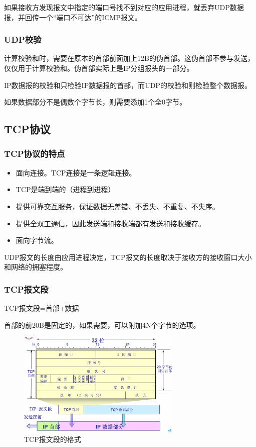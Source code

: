 \documentclass[12pt, a4paper, oneside]{ctexart}
\begin{document}
如果接收方发现报文中指定的端口号找不到对应的应用进程，就丢弃UDP数据报，并回传一个“端口不可达”的ICMP报文。

\subsubsection{UDP校验}

计算校验和时，需要在原本的首部前面加上12B的伪首部。这伪首部不参与发送，仅仅用于计算校验和。伪首部实际上是IP分组报头的一部分。

IP数据报的校验和只检验IP数据报的首部，而UDP的校验和则检验整个数据报。

如果数据部分不是偶数个字节长，则需要添加1个全0字节。

\subsection{TCP协议}

\subsubsection{TCP协议的特点}

\begin{itemize}
    \item 面向连接。TCP连接是一条逻辑连接。
    \item TCP是端到端的（进程到进程）
    \item 提供可靠交互服务，保证数据无差错、不丢失、不重复、不失序。
    \item 提供全双工通信，因此发送端和接收端都有发送和接收缓存。
    \item 面向字节流。
\end{itemize}

UDP报文的长度由应用进程决定，TCP报文的长度取决于接收方的接收窗口大小和网络的拥塞程度。

\subsubsection{TCP报文段}

TCP报文段=首部+数据

首部的前20B是固定的，如果需要，可以附加4N个字节的选项。

\begin{figure}[h]
    \centering
    \includegraphics[width=0.7\textwidth]{./images/tcp_segment.png}
    \caption{TCP报文段的格式}
\end{figure}
\end{document}
